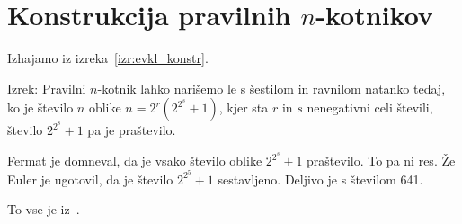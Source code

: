 \section{Konstrukcija pravilnih $n$-kotnikov}


Izhajamo iz izreka~\ref{izr:evkl_konstr}.

Izrek: Pravilni $n$-kotnik lahko narišemo le s šestilom in ravnilom natanko tedaj, ko je število $n$ oblike $ n = 2^r(2^{2^s} + 1) $, kjer sta $r$ in $s$ nenegativni celi števili, število $2^{2^s} + 1$ pa je praštevilo.

Fermat je domneval, da je vsako število oblike $2^{2^s} + 1$ praštevilo. To pa ni res. Že Euler je ugotovil, da je število $2^{2^5} + 1$ sestavljeno. Deljivo je s številom 641.

To vse je iz~\cite[str.\ 78]{jerman1998}.